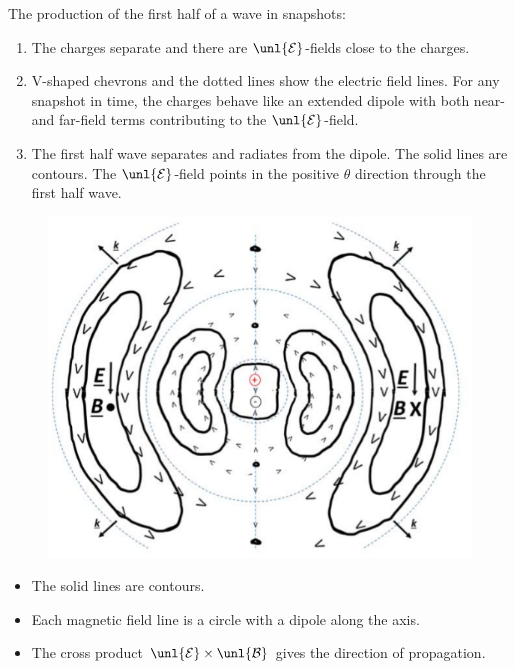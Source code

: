 \documentclass[a4paper, 11pt, normalem]{report}
\renewcommand\E{\mathcal{E}}
\newcommand\uE{\unl{\E}}
\renewcommand\B{\mathcal{B}}
\newcommand\uB{\unl{\B}}
\begin{document}
The production of the first half of a wave in snapshots:
\begin{enumerate}
	\item The charges separate and there are $\uE$-fields close to the charges.
	\item V-shaped chevrons and the dotted lines show the electric field lines.
	For any snapshot in time, the charges behave like an extended dipole with both near- and far-field terms contributing to the $\uE$-field.
	\item The first half wave separates and radiates from the dipole.
	The solid lines are contours.
	The $\uE$-field points in the positive $\theta$ direction through the first half wave.
\end{enumerate}

\begin{figure}[H]
	\centering
	\includegraphics[scale=0.4]{waveprod.png}
\end{figure}

\begin{itemize}
	\item The solid lines are contours.
	\item Each magnetic field line is a circle with a dipole along the axis.
	\item The cross product $\uE\times\uB$ gives the direction of propagation.
\end{itemize}
\end{document}
